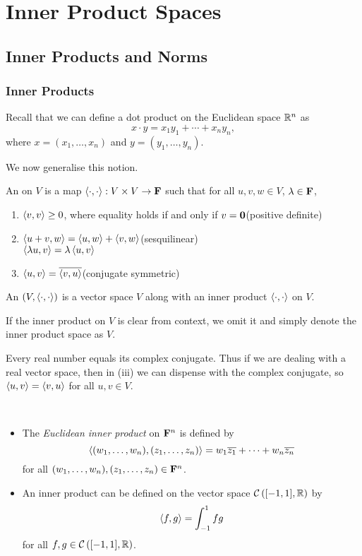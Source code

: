\chapter{Inner Product Spaces}\label{chap:inner-product-spaces}
\section{Inner Products and Norms}
\subsection{Inner Products}
Recall that we can define a dot product on the Euclidean space $\mathbb R^n$ as
\[x\cdot y=x_1y_1+\cdots+x_ny_n,\]
where $x=(x_1,\dots,x_n)$ and $y=(y_1,\dots,y_n)$.

We now generalise this notion.

\begin{definition}
An  on $V$ is a map $\left\langle\cdot,\cdot\right\rangle:V\times V\to\mathbf F$ such that for all $u,v,w\in V$, $\lambda\in\mathbf F$,
\begin{enumerate}[label=(\roman*)]
\item $\left\langle v,v\right\rangle\ge0$, where equality holds if and only if $v=\vb{0}$\hfill(positive definite)
\item $\left\langle u+v,w\right\rangle=\left\langle u,w\right\rangle+\left\langle v,w\right\rangle$\hfill(sesquilinear)\\
$\left\langle\lambda u,v\right\rangle=\lambda\left\langle u,v\right\rangle$
\item $\left\langle u,v\right\rangle=\overline{\left\langle v,u\right\rangle}$\hfill(conjugate symmetric)
\end{enumerate}
An  $\left(V,\left\langle\cdot,\cdot\right\rangle\right)$ is a vector space $V$ along with an inner product $\left\langle\cdot,\cdot\right\rangle$ on $V$.
\end{definition}

\begin{notation}
If the inner product on $V$ is clear from context, we omit it and simply denote the inner product space as $V$.
\end{notation}

\begin{remark}
Every real number equals its complex conjugate. Thus if we are dealing with a real vector space, then in (iii) we can dispense with the complex conjugate, so $\left\langle u,v\right\rangle=\left\langle v,u\right\rangle$ for all $u,v\in V$.
\end{remark}

\begin{example} \
\begin{itemize}
\item The \emph{Euclidean inner product} on $\mathbf F^n$ is defined by
\[\left\langle(w_1,\dots,w_n),(z_1,\dots,z_n)\right\rangle=w_1\overline{z_1}+\cdots+w_n\overline{z_n}\]
for all $(w_1,\dots,w_n),(z_1,\dots,z_n)\in\mathbf F^n$.

\item An inner product can be defined on the vector space $\mathcal{C}\left([-1,1],\mathbb R\right)$ by
\[\left\langle f,g\right\rangle=\int_{-1}^{1}fg\]
for all $f,g\in\mathcal{C}\left([-1,1],\mathbb R\right)$.
\end{itemize}
\end{example}

